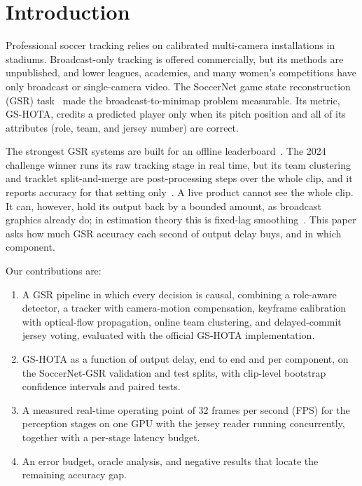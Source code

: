 \documentclass[conference]{IEEEtran}
\begin{document}
\section{Introduction}
Professional soccer tracking relies on calibrated multi-camera installations in stadiums. Broadcast-only tracking is offered commercially, but its methods are unpublished, and lower leagues, academies, and many women's competitions have only broadcast or single-camera video. The SoccerNet game state reconstruction (GSR) task~\cite{somers2024gsr} made the broadcast-to-minimap problem measurable. Its metric, GS-HOTA, credits a predicted player only when its pitch position and all of its attributes (role, team, and jersey number) are correct.

The strongest GSR systems are built for an offline leaderboard~\cite{golovkin2025minimap,soccernet2025results,oo2026broadcast2pitch}. The 2024 challenge winner runs its raw tracking stage in real time, but its team clustering and tracklet split-and-merge are post-processing steps over the whole clip, and it reports accuracy for that setting only~\cite{golovkin2025minimap}. A live product cannot see the whole clip. It can, however, hold its output back by a bounded amount, as broadcast graphics already do; in estimation theory this is fixed-lag smoothing~\cite{sarkka2013bayesian}. This paper asks how much GSR accuracy each second of output delay buys, and in which component.

Our contributions are:
\begin{enumerate}
\item A GSR pipeline in which every decision is causal, combining a role-aware detector, a tracker with camera-motion compensation, keyframe calibration with optical-flow propagation, online team clustering, and delayed-commit jersey voting, evaluated with the official GS-HOTA implementation.
\item GS-HOTA as a function of output delay, end to end and per component, on the SoccerNet-GSR validation and test splits, with clip-level bootstrap confidence intervals and paired tests.
\item A measured real-time operating point of 32 frames per second (FPS) for the perception stages on one GPU with the jersey reader running concurrently, together with a per-stage latency budget.
\item An error budget, oracle analysis, and negative results that locate the remaining accuracy gap.
\end{enumerate}
\end{document}
